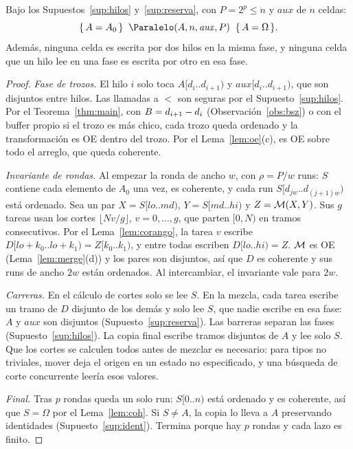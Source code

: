 \begin{lema}[Paralelo]\label{lem:paralelo}
Bajo los Supuestos~\ref{sup:hilos} y~\ref{sup:reserva}, con $P=2^p\le n$ y
$\mathit{aux}$ de $n$ celdas:
\[
\hoare{A=A_0}{\Paralelo(A,n,\mathit{aux},P)}{A=\Omega}.
\]
Además, ninguna celda es escrita por dos hilos en la misma fase, y ninguna celda que un
hilo lee en una fase es escrita por otro en esa fase.
\end{lema}
\begin{proof}
\emph{Fase de trozos.} El hilo $i$ solo toca $A[d_i..d_{i+1})$ y
$\mathit{aux}[d_i..d_{i+1})$, que son disjuntos entre hilos. Las llamadas a $\lt$ son
seguras por el Supuesto~\ref{sup:hilos}. Por el Teorema~\ref{thm:main}, con
$B=d_{i+1}-d_i$ (Observación~\ref{obs:bsz}) o con el buffer propio si el trozo es más
chico, cada trozo queda ordenado y la transformación es OE dentro del trozo. Por el
Lema~\ref{lem:oe}(c), es OE sobre todo el arreglo, que queda coherente.

\emph{Invariante de rondas.} Al empezar la ronda de ancho $w$, con $\rho=P/w$ runs:
$S$ contiene cada elemento de $A_0$ una vez, es coherente, y cada run
$S[d_{jw}..d_{(j+1)w})$ está ordenado. Sea un par $X=S[lo..md)$, $Y=S[md..hi)$ y
$Z=\mathcal{M}(X,Y)$. Sus $g$ tareas usan los cortes $\lfloor Nv/g\rfloor$, $v=0,\dots,g$, que
parten $[0,N)$ en tramos consecutivos. Por el Lema~\ref{lem:corango}, la tarea $v$
escribe $D[lo{+}k_0..lo{+}k_1)=Z[k_0..k_1)$, y entre todas escriben
$D[lo..hi)=Z$. $\mathcal{M}$ es OE (Lema~\ref{lem:merge}(d)) y los pares son disjuntos, así que
$D$ es coherente y sus runs de ancho $2w$ están ordenados. Al intercambiar, el invariante
vale para $2w$.

\emph{Carreras.} En el cálculo de cortes solo se lee $S$. En la mezcla, cada tarea
escribe un tramo de $D$ disjunto de los demás y solo lee $S$, que nadie escribe en esa
fase: $A$ y $\mathit{aux}$ son disjuntos (Supuesto~\ref{sup:reserva}). Las barreras
separan las fases (Supuesto~\ref{sup:hilos}). La copia final escribe tramos disjuntos de
$A$ y lee solo $S$. Que los cortes se calculen todos antes de mezclar es necesario:
para tipos no triviales, mover deja el origen en un estado no especificado, y una
búsqueda de corte concurrente leería esos valores.

\emph{Final.} Tras $p$ rondas queda un solo run: $S[0..n)$ está ordenado y es coherente,
así que $S=\Omega$ por el Lema~\ref{lem:coh}. Si $S\ne A$, la copia lo lleva a $A$
preservando identidades (Supuesto~\ref{sup:ident}). Termina porque hay $p$ rondas y cada
lazo es finito.
\end{proof}

